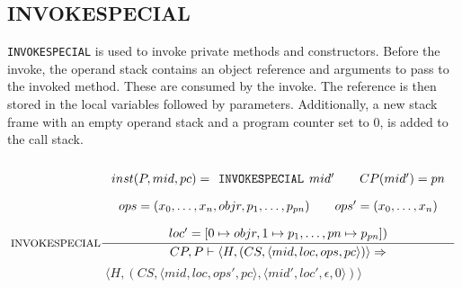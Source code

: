 \subsection{INVOKESPECIAL}
\texttt{INVOKESPECIAL} is used to invoke private methods and constructors.
Before the invoke, the operand stack contains an object reference and arguments to pass to the invoked method. These are consumed by the invoke. The reference is then stored in the local variables followed by parameters. Additionally, a new stack frame with an empty operand stack and a program counter set to $0$, is added to the call stack.
\\\\
$$\inference[INVOKESPECIAL]{
inst(P,mid,pc) = \texttt{INVOKESPECIAL }mid' \semsp 
CP(mid') = pn \semnl \\
ops = (x_0, \ldots, x_n, objr, p_1, \ldots, p_{pn}) \semsp
ops' = (x_0, \ldots, x_{n}) \semnl\\
loc' = [0 \mapsto objr, 1 \mapsto p_{1}, \ldots, pn \mapsto p_{pn}])}
{CP, P \vdash \langle H, (CS, \langle mid, loc, ops, pc \rangle)\rangle \Rightarrow }$$
$$\langle H, (CS, \langle mid, loc, ops', pc \rangle, \langle mid', loc', \epsilon, 0 \rangle)\rangle$$\\\\


